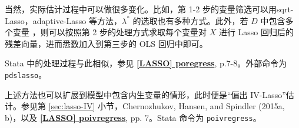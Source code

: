 

{ \def\FigName{Fig-lasso-poreg-01}
%	
%		
%		




当然，实际估计过程中可以做很多变化。比如，第 1-2 步的变量筛选可以用sqrt-Lasso，adaptive-Lasso 等方法，$\lambda^*$ 的选取也有多种方式。此外，若 $D$ 中包含多个变量%
，则可以按照第 2 步的处理方式求取每个变量对 $X$ 进行 Lasso 回归后的残差向量，进而悉数加入到第三步的 OLS 回归中即可。

Stata 中的处理过程与此相似，参见 \href{https://www.stata.com/manuals/lassoporegress.pdf}{\bfseries{[\MakeUppercase{lasso}] poregress}}, p.7-8。外部命令为 \texttt{pdslasso}。

上述方法也可以扩展到模型中包含内生变量的情形，此时便是“偏出 IV-Lasso”估计。参见第 \ref{sec:lasso-IV} 小节，Chernozhukov, Hansen, and Spindler (2015a, b)，以及 \href{https://www.stata.com/manuals/lassopoivregress.pdf}{\bfseries{[\MakeUppercase{lasso}] poivregress}}, pp. 7。Stata 命令为 \texttt{poivregress}。 


\iffalse %

}
